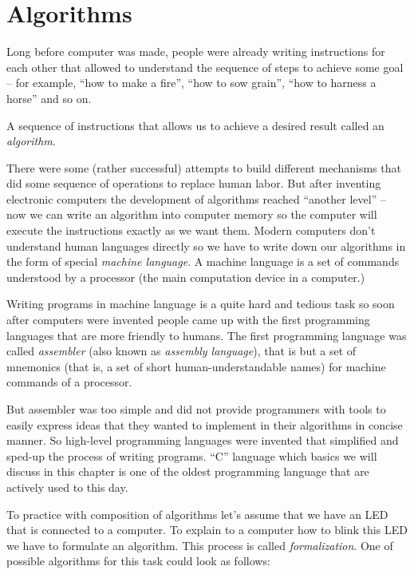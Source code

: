 \documentclass[../sparc.tex]{subfiles}
\begin{document}
\section{Algorithms}

Long before computer was made, people were already writing instructions for each
other that allowed to understand the sequence of steps to achieve some goal --
for example, ``how to make a fire'', ``how to sow grain'', ``how to harness a
horse'' and so on.

A sequence of instructions that allows us to achieve a desired result called an
\emph{algorithm}.

There were some (rather successful) attempts to build different mechanisms that
did some sequence of operations to replace human labor.  But after inventing
electronic computers the development of algorithms reached ``another level'' --
now we can write an algorithm into computer memory so the computer will execute
the instructions exactly as we want them.  Modern computers don't understand
human languages directly so we have to write down our algorithms in the form of
special \emph{machine language}.  A machine language is a set of commands
understood by a processor (the main computation device in a computer.)

Writing programs in machine language is a quite hard and tedious task so soon
after computers were invented people came up with the first programming
languages that are more friendly to humans.  The first programming language was
called \emph{assembler} (also known as \emph{assembly language}), that is but a
set of mnemonics (that is, a set of short human-understandable names) for
machine commands of a processor.

But assembler was too simple and did not provide programmers with tools to
easily express ideas that they wanted to implement in their algorithms in
concise manner.  So high-level programming languages were invented that
simplified and sped-up the process of writing programs.  ``C'' language which
basics we will discuss in this chapter is one of the oldest programming language
that are actively used to this day.

To practice with composition of algorithms let's assume that we have an LED that
is connected to a computer.  To explain to a computer how to blink this LED we
have to formulate an algorithm.  This process is called \emph{formalization}.
One of possible algorithms for this task could look as follows:
\end{document}
